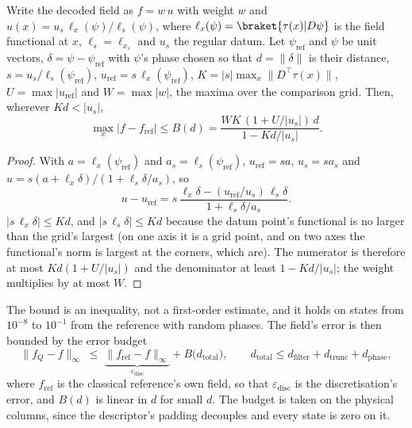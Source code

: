 \begin{proposition}
\label{prop:readout-bound}
Write the decoded field as $f=w\,u$ with weight $w$ and $u(x)=u_s\,\ell_x(\psi)/\ell_s(\psi)$, where $\ell_x(\psi)=\braket{\tau(x)|D\psi}$ is the field functional at $x$, $\ell_s=\ell_{x_s}$ and $u_s$ the regular datum. Let $\psi_{\mathrm{ref}}$ and $\psi$ be unit vectors, $\delta=\psi-\psi_{\mathrm{ref}}$ with $\psi$'s phase chosen so that $d=\|\delta\|$ is their distance, $s=u_s/\ell_s(\psi_{\mathrm{ref}})$, $u_{\mathrm{ref}}=s\,\ell_x(\psi_{\mathrm{ref}})$, $K=|s|\max_x\|D^\top\tau(x)\|$, $U=\max|u_{\mathrm{ref}}|$ and $W=\max|w|$, the maxima over the comparison grid. Then, wherever $Kd<|u_s|$,
\begin{equation*}
    \max_x|f-f_{\mathrm{ref}}|\le B(d)=\frac{WK\,(1+U/|u_s|)\,d}{1-Kd/|u_s|}.
\end{equation*}
\end{proposition}
\begin{proof}
With $a=\ell_x(\psi_{\mathrm{ref}})$ and $a_s=\ell_s(\psi_{\mathrm{ref}})$, $u_{\mathrm{ref}}=sa$, $u_s=sa_s$ and $u=s(a+\ell_x\delta)/(1+\ell_s\delta/a_s)$, so
\begin{equation*}
    u-u_{\mathrm{ref}}=s\,\frac{\ell_x\delta-(u_{\mathrm{ref}}/u_s)\,\ell_s\delta}{1+\ell_s\delta/a_s}.
\end{equation*}
$|s\,\ell_x\delta|\le Kd$, and $|s\,\ell_s\delta|\le Kd$ because the datum point's functional is no larger than the grid's largest (on one axis it is a grid point, and on two axes the functional's norm is largest at the corners, which are). The numerator is therefore at most $Kd(1+U/|u_s|)$ and the denominator at least $1-Kd/|u_s|$; the weight multiplies by at most $W$.
\end{proof}

The bound is an inequality, not a first-order estimate, and it holds on states from $10^{-8}$ to $10^{-1}$ from the reference with random phases. The field's error is then bounded by the error budget
\begin{equation}
    \|f_Q-f\|_\infty\;\le\;\underbrace{\|f_{\mathrm{ref}}-f\|_\infty}_{\varepsilon_{\mathrm{disc}}}+B\bigl(d_{\mathrm{total}}\bigr),
    \qquad
    d_{\mathrm{total}}\le d_{\mathrm{filter}}+d_{\mathrm{trunc}}+d_{\mathrm{phase}} ,
    \label{eq:error-budget}
\end{equation}
where $f_{\mathrm{ref}}$ is the classical reference's own field, so that $\varepsilon_{\mathrm{disc}}$ is the discretisation's error, and $B(d)$ is linear in $d$ for small $d$. The budget is taken on the physical columns, since the descriptor's padding decouples and every state is zero on it.

